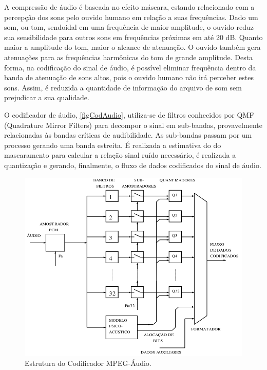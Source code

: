 A compressão de áudio é baseada no  efeito máscara, estando relacionado com a percepção dos sons pelo ouvido humano em relação a suas frequências. Dado um som, ou tom, sendoidal em uma frequência de maior amplitude, o ouvido reduz sua sensibilidade para outros sons em frequências próximas em até 20 dB. Quanto maior a amplitude do tom, maior o alcance de atenuação. O ouvido também gera atenuações para as frequências harmônicas do tom de grande amplitude.
Desta forma, na codificação do sinal de áudio, é possível eliminar frequência dentro da banda de atenuação de sons altos, pois o ouvido humano não irá perceber estes sons. Assim, é reduzida a quantidade de informação do arquivo de som sem prejudicar a sua qualidade.


O codificador de áudio, \autoref{figCodAudio}, utiliza-se de filtros conhecidos por QMF (Quadrature Mirror Filters) para decompor o sinal em sub-bandas, provavelmente relacionadas às bandas críticas de audibilidade. As sub-bandas passam por um processo gerando uma banda estreita. É realizada a estimativa do do mascaramento para calcular a relação sinal ruído necessário, é realizada a quantização e gerando, finalmente, o fluxo de dados codificados do sinal de áudio. 

\begin{figure}[htb]
	\caption{\label{figCodAudio} Estrutura do Codificador MPEG-Áudio.}
	\begin{center}
		\includegraphics[width=\ScaleIfNeeded]{figCodAudio.png}
	\end{center}
\end{figure}
